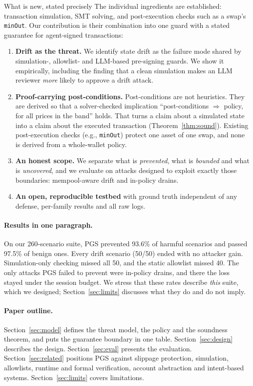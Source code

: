\documentclass[11pt]{article}
\newcommand{\pgs}{\textsc{PGS}}
\begin{document}
\begin{keybox}{What is new, stated precisely}
The individual ingredients are established: transaction simulation, SMT solving, and post-execution checks such as a swap's \texttt{minOut}. Our contribution is their combination into one guard with a stated guarantee for agent-signed transactions:
\begin{enumerate}[leftmargin=14pt]
\item \textbf{Drift as the threat.} We identify state drift as the failure mode shared by simulation-, allowlist- and LLM-based pre-signing guards. We show it empirically, including the finding that a clean simulation makes an LLM reviewer \emph{more} likely to approve a drift attack.
\item \textbf{Proof-carrying post-conditions.} Post-conditions are not heuristics. They are derived so that a solver-checked implication ``post-conditions $\Rightarrow$ policy, for all prices in the band'' holds. That turns a claim about a simulated state into a claim about the executed transaction (Theorem~\ref{thm:sound}). Existing post-execution checks (e.g., \texttt{minOut}) protect one asset of one swap, and none is derived from a whole-wallet policy.
\item \textbf{An honest scope.} We separate what is \emph{prevented}, what is \emph{bounded} and what is \emph{uncovered}, and we evaluate on attacks designed to exploit exactly those boundaries: mempool-aware drift and in-policy drains.
\item \textbf{An open, reproducible testbed} with ground truth independent of any defense, per-family results and all raw logs.
\end{enumerate}
\end{keybox}

\paragraph{Results in one paragraph.} On our 260-scenario suite, \pgs{} prevented 93.6\% of harmful scenarios and passed 97.5\% of benign ones. Every drift scenario (50/50) ended with no attacker gain. Simulation-only checking missed all 50, and the static allowlist missed 40. The only attacks \pgs{} failed to prevent were in-policy drains, and there the loss stayed under the session budget. We stress that these rates describe \emph{this} suite, which we designed; Section~\ref{sec:limits} discusses what they do and do not imply.

\paragraph{Paper outline.} Section~\ref{sec:model} defines the threat model, the policy and the soundness theorem, and puts the guarantee boundary in one table. Section~\ref{sec:design} describes the design. Section~\ref{sec:eval} presents the evaluation. Section~\ref{sec:related} positions \pgs{} against slippage protection, simulation, allowlists, runtime and formal verification, account abstraction and intent-based systems. Section~\ref{sec:limits} covers limitations.
\end{document}
